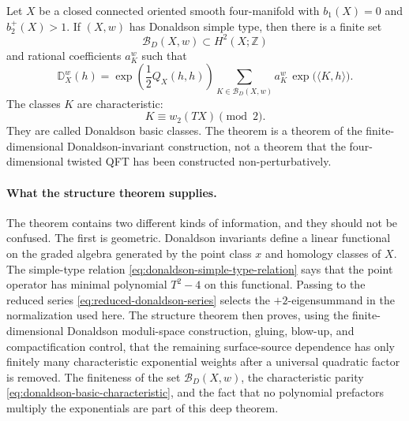 \begin{quotedtheorem}
\label{qt:donaldson-simple-type-structure}
Let \(X\) be a closed connected oriented smooth four-manifold with
\(b_1(X)=0\) and \(b_2^+(X)>1\).  If \((X,w)\) has Donaldson simple type, then
there is a finite set
\[
  \mathcal B_D(X,w)\subset H^2(X;\mathbb Z)
\]
and rational coefficients \(a_K^w\) such that
\begin{equation}
  \mathbb D_X^w(h)
  =
  \exp\!\left(\frac{1}{2}Q_X(h,h)\right)
  \sum_{K\in\mathcal B_D(X,w)}
  a_K^w\,\exp\!\bigl(\langle K,h\rangle\bigr).
  \label{eq:donaldson-simple-type-exponential-form}
\end{equation}
The classes \(K\) are characteristic:
\begin{equation}
  K\equiv w_2(TX)\pmod 2.
  \label{eq:donaldson-basic-characteristic}
\end{equation}
They are called Donaldson basic classes.  The theorem is a theorem of the
finite-dimensional Donaldson-invariant construction, not a theorem that the
four-dimensional twisted QFT has been constructed non-perturbatively.
\end{quotedtheorem}

\paragraph{What the structure theorem supplies.}
The theorem contains two different kinds of information, and they should not be
confused.  The first is geometric.  Donaldson invariants define a linear
functional on the graded algebra generated by the point class \(x\) and
homology classes of \(X\).  The simple-type relation
\eqref{eq:donaldson-simple-type-relation} says that the point operator has
minimal polynomial \(T^2-4\) on this functional.  Passing to the reduced series
\eqref{eq:reduced-donaldson-series} selects the \(+2\)-eigensummand in the
normalization used here.  The structure theorem then proves, using the
finite-dimensional Donaldson moduli-space construction, gluing, blow-up, and
compactification control, that the remaining surface-source dependence has
only finitely many characteristic exponential weights after a universal
quadratic factor is removed.  The finiteness of the set
\(\mathcal B_D(X,w)\), the characteristic parity
\eqref{eq:donaldson-basic-characteristic}, and the fact that no polynomial
prefactors multiply the exponentials are part of this deep theorem.

